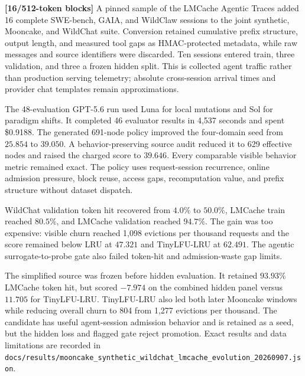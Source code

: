 \documentclass[11pt]{article}
\newcommand{\filepath}[1]{\nolinkurl{#1}}
\newcommand{\blocktag}[1]{\textbf{\color{navy}[#1-token blocks]}}
\begin{document}
\blocktag{16/512} A pinned sample of the LMCache Agentic Traces added 16
complete SWE-bench, GAIA, and WildClaw sessions to the joint synthetic,
Mooncake, and WildChat suite.  Conversion retained cumulative prefix structure,
output length, and measured tool gaps as HMAC-protected metadata, while raw
messages and source identifiers were discarded.  Ten sessions entered train,
three validation, and three a frozen hidden split.  This is collected agent
traffic rather than production serving telemetry; absolute cross-session
arrival times and provider chat templates remain approximations.

The 48-evaluation GPT-5.6 run used Luna for local mutations and Sol for paradigm
shifts.  It completed 46 evaluator results in 4,537 seconds and spent
\$0.9188.  The generated 691-node policy improved the four-domain seed from
$25.854$ to $39.050$.  A behavior-preserving source audit reduced it to 629
effective nodes and raised the charged score to $39.646$.  Every comparable
visible behavior metric remained exact.  The policy uses request-session
recurrence, online admission pressure, block reuse, access gaps, recomputation
value, and prefix structure without dataset dispatch.

WildChat validation token hit recovered from $4.0\%$ to $50.0\%$, LMCache
train reached $80.5\%$, and LMCache validation reached $94.7\%$.  The gain was
too expensive: visible churn reached 1,098 evictions per thousand requests and
the score remained below LRU at $47.321$ and TinyLFU-LRU at $62.491$.  The
agentic surrogate-to-probe gate also failed token-hit and admission-waste gap
limits.

The simplified source was frozen before hidden evaluation.  It retained
$93.93\%$ LMCache token hit, but scored $-7.974$ on the combined hidden panel
versus $11.705$ for TinyLFU-LRU.  TinyLFU-LRU also led both later Mooncake
windows while reducing overall churn to 804 from 1,277 evictions per thousand.
The candidate has useful agent-session admission behavior and is retained as a
seed, but the hidden loss and flagged gate reject promotion.  Exact results and
data limitations are recorded in
\filepath{docs/results/mooncake\_synthetic\_wildchat\_lmcache\_evolution\_20260907.json}.
\end{document}
